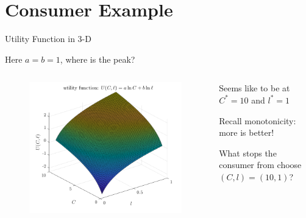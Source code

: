 \documentclass[11pt,aspectratio=169,usenames,dvipsnames]{beamer}
\let\tempone\itemize
\let\temptwo\enditemize
\renewenvironment{itemize}{\tempone\addtolength{\itemsep}{\fill}}{\temptwo}
\begin{document}
\section{Consumer Example}
\label{sec:Consumer_Example}

\begin{frame}{Utility Function in 3-D}
\label{slide:Utility_Function_in_3_D}
    \begin{center}
        Here $ a = b = 1 $, \alert{where is the peak?}
    \end{center}
    \begin{columns}
        \begin{column}{0.6\textwidth}
            \begin{figure}
                \includegraphics[width=.9\textwidth]{./figures/Utility.png}
            \end{figure}
        \end{column}
        \begin{column}{0.4\textwidth}
            \begin{itemize}
                \item Seems like to be at $ C^{*} = 10 $ and $ l^{*} = 1 $
                \item Recall \alert{monotonicity}: more is better!
                \item What \alert{stops} the consumer from choose $ ( C, l ) = ( 10, 1 ) $?
            \end{itemize}
        \end{column}
    \end{columns}
\end{frame}
\end{document}
